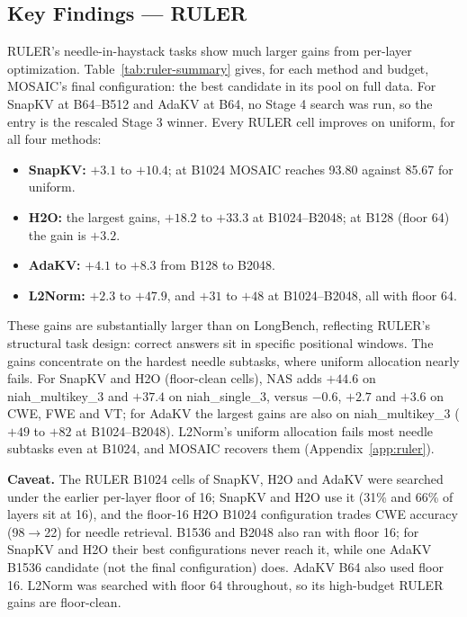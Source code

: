 \documentclass[11pt]{article}
\begin{document}
\subsection{Key Findings — RULER}

RULER's needle-in-haystack tasks show much larger gains from per-layer optimization. Table~\ref{tab:ruler-summary} gives, for each method and budget, MOSAIC's final configuration: the best candidate in its pool on full data. For SnapKV at B64--B512 and AdaKV at B64, no Stage 4 search was run, so the entry is the rescaled Stage 3 winner. Every RULER cell improves on uniform, for all four methods:

\begin{itemize}
\item \textbf{SnapKV:} $+3.1$ to $+10.4$; at B1024 MOSAIC reaches 93.80 against 85.67 for uniform.
\item \textbf{H2O:} the largest gains, $+18.2$ to $+33.3$ at B1024--B2048; at B128 (floor 64) the gain is $+3.2$.
\item \textbf{AdaKV:} $+4.1$ to $+8.3$ from B128 to B2048.
\item \textbf{L2Norm:} $+2.3$ to $+47.9$, and $+31$ to $+48$ at B1024--B2048, all with floor 64.
\end{itemize}

These gains are substantially larger than on LongBench, reflecting RULER's structural task design: correct answers sit in specific positional windows. The gains concentrate on the hardest needle subtasks, where uniform allocation nearly fails. For SnapKV and H2O (floor-clean cells), NAS adds $+44.6$ on niah\_multikey\_3 and $+37.4$ on niah\_single\_3, versus $-0.6$, $+2.7$ and $+3.6$ on CWE, FWE and VT; for AdaKV the largest gains are also on niah\_multikey\_3 ($+49$ to $+82$ at B1024--B2048). L2Norm's uniform allocation fails most needle subtasks even at B1024, and MOSAIC recovers them (Appendix~\ref{app:ruler}).

\textbf{Caveat.} The RULER B1024 cells of SnapKV, H2O and AdaKV were searched under the earlier per-layer floor of 16; SnapKV and H2O use it (31\% and 66\% of layers sit at 16), and the floor-16 H2O B1024 configuration trades CWE accuracy (98$\rightarrow$22) for needle retrieval. B1536 and B2048 also ran with floor 16; for SnapKV and H2O their best configurations never reach it, while one AdaKV B1536 candidate (not the final configuration) does. AdaKV B64 also used floor 16. L2Norm was searched with floor 64 throughout, so its high-budget RULER gains are floor-clean.
\end{document}
